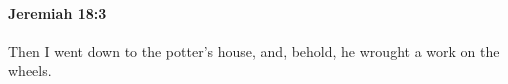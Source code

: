 
		\paragraph{Jeremiah 18:3} %
			\label{JEREMIAH-18-3}

			Then I went down to the potter’s house, and, behold, he wrought a work on the wheels.


